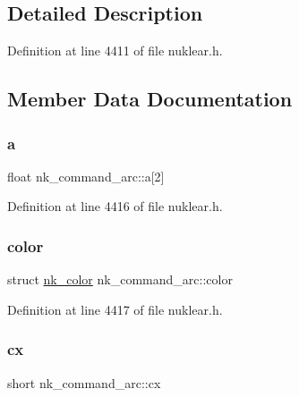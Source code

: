 \subsection{Detailed Description}


Definition at line 4411 of file nuklear.\+h.



\subsection{Member Data Documentation}
\mbox{\label{structnk__command__arc_a446403034fc3de885fe610d9fdd7c7bb}} 
\subsubsection{\texorpdfstring{a}{a}}
{\footnotesize\ttfamily float nk\+\_\+command\+\_\+arc\+::a\mbox{[}2\mbox{]}}



Definition at line 4416 of file nuklear.\+h.

\mbox{\label{structnk__command__arc_ab74d0d447665a04b87b656eb300a5884}} 
\subsubsection{\texorpdfstring{color}{color}}
{\footnotesize\ttfamily struct \mbox{\hyperlink{structnk__color}{nk\+\_\+color}} nk\+\_\+command\+\_\+arc\+::color}



Definition at line 4417 of file nuklear.\+h.

\mbox{\label{structnk__command__arc_ac348e962a2508e0c537b6dd5c8363b01}} 
\subsubsection{\texorpdfstring{cx}{cx}}
{\footnotesize\ttfamily short nk\+\_\+command\+\_\+arc\+::cx}



